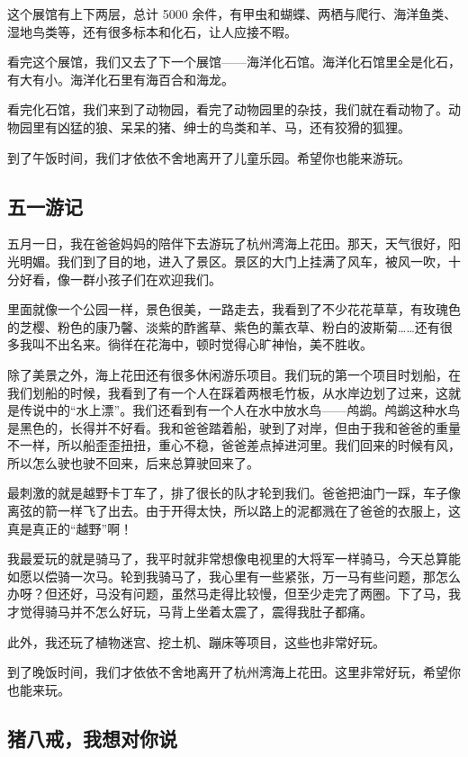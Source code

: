 \documentclass[UTF8,a4paper,titlepage,twoside,10.5pt]{article}
\begin{document}
这个展馆有上下两层，总计 5000 余件，有甲虫和蝴蝶、两栖与爬行、海洋鱼类、湿地鸟类等，还有很多标本和化石，让人应接不暇。

看完这个展馆，我们又去了下一个展馆——海洋化石馆。海洋化石馆里全是化石，有大有小。海洋化石里有海百合和海龙。

看完化石馆，我们来到了动物园，看完了动物园里的杂技，我们就在看动物了。动物园里有凶猛的狼、呆呆的猪、绅士的鸟类和羊、马，还有狡猾的狐狸。

到了午饭时间，我们才依依不舍地离开了儿童乐园。希望你也能来游玩。

\subsection{五一游记}
\label{sec:orgc65bc23}

五月一日，我在爸爸妈妈的陪伴下去游玩了杭州湾海上花田。那天，天气很好，阳光明媚。我们到了目的地，进入了景区。景区的大门上挂满了风车，被风一吹，十分好看，像一群小孩子们在欢迎我们。

里面就像一个公园一样，景色很美，一路走去，我看到了不少花花草草，有玫瑰色的芝樱、粉色的康乃馨、淡紫的酢酱草、紫色的薰衣草、粉白的波斯菊……还有很多我叫不出名来。徜徉在花海中，顿时觉得心旷神怡，美不胜收。

除了美景之外，海上花田还有很多休闲游乐项目。我们玩的第一个项目时划船，在我们划船的时候，我看到了有一个人在踩着两根毛竹板，从水岸边划了过来，这就是传说中的“水上漂”。我们还看到有一个人在水中放水鸟——鸬鹚。鸬鹚这种水鸟是黑色的，长得并不好看。我和爸爸踏着船，驶到了对岸，但由于我和爸爸的重量不一样，所以船歪歪扭扭，重心不稳，爸爸差点掉进河里。我们回来的时候有风，所以怎么驶也驶不回来，后来总算驶回来了。

最刺激的就是越野卡丁车了，排了很长的队才轮到我们。爸爸把油门一踩，车子像离弦的箭一样飞了出去。由于开得太快，所以路上的泥都溅在了爸爸的衣服上，这真是真正的“越野”啊！

我最爱玩的就是骑马了，我平时就非常想像电视里的大将军一样骑马，今天总算能如愿以偿骑一次马。轮到我骑马了，我心里有一些紧张，万一马有些问题，那怎么办呀？但还好，马没有问题，虽然马走得比较慢，但至少走完了两圈。下了马，我才觉得骑马并不怎么好玩，马背上坐着太震了，震得我肚子都痛。

此外，我还玩了植物迷宫、挖土机、蹦床等项目，这些也非常好玩。

到了晚饭时间，我们才依依不舍地离开了杭州湾海上花田。这里非常好玩，希望你也能来玩。

\subsection{猪八戒，我想对你说}
\label{sec:org6421da7}
\end{document}
